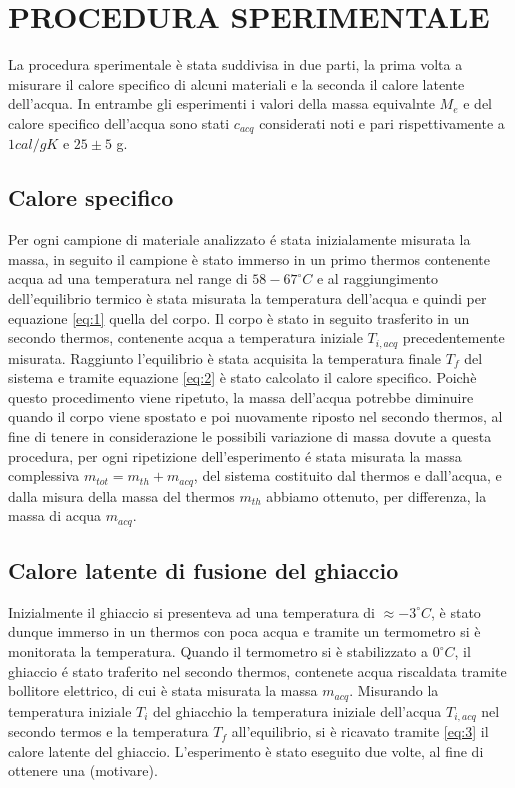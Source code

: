 \documentclass{article_saj}
\begin{document}
\section{PROCEDURA SPERIMENTALE}
     La procedura sperimentale è stata suddivisa in due parti, la prima 
     volta a misurare il calore specifico di alcuni materiali e la seconda 
     il calore latente dell'acqua. In entrambe gli esperimenti i valori della massa equivalnte $M_e$ 
     e del calore specifico dell'acqua sono stati $c_{acq}$ considerati noti e pari rispettivamente a $1 cal/gK$
     e $25 \pm 5$ g.
\subsection{Calore specifico}
Per ogni campione di materiale analizzato é stata inizialamente misurata la massa,
in seguito il campione è stato immerso in un primo thermos contenente acqua 
ad una temperatura nel range di $ 58-67 ^\circ C$ e al raggiungimento dell'equilibrio termico è stata
misurata la temperatura dell'acqua e quindi per equazione \ref{eq:1} quella del corpo. 
Il corpo è stato in seguito trasferito in un secondo thermos, contenente acqua a temperatura iniziale $T_{i,acq}$ precedentemente
misurata. Raggiunto l'equilibrio è stata acquisita la temperatura finale $T_f$ del sistema e tramite
equazione \ref{eq:2} è stato calcolato il calore specifico.
Poichè questo procedimento viene ripetuto, la massa dell'acqua potrebbe diminuire quando
il corpo viene spostato e poi nuovamente riposto nel secondo thermos, al fine di 
tenere in considerazione le possibili variazione di massa dovute a questa procedura,
per ogni ripetizione dell'esperimento é stata misurata la massa complessiva $m_{tot} = m_{th} + m_{acq}$, del
sistema costituito dal thermos e dall'acqua, e dalla misura della massa del thermos $m_{th}$
abbiamo ottenuto, per differenza, la massa di acqua $m_{acq}$.



\subsection{Calore latente di fusione del ghiaccio}
Inizialmente il ghiaccio si presenteva ad una temperatura di $\approx -3^\circ C$,
è stato dunque immerso in un thermos con poca acqua e tramite un termometro si è monitorata
la temperatura. Quando il termometro si è stabilizzato a $ 0 ^\circ C$, il ghiaccio é stato 
traferito nel secondo thermos, contenete acqua riscaldata tramite bollitore elettrico,
di cui è stata misurata la massa $m_{acq}$.
Misurando la temperatura iniziale $T_i$ del ghiacchio la temperatura iniziale dell'acqua $T_{i,acq}$
nel secondo termos e la temperatura $T_f$ all'equilibrio, si è ricavato tramite \ref{eq:3}
il calore latente del ghiaccio. L'esperimento è stato eseguito due volte, al fine di ottenere 
una (motivare).
\indent
\end{document}
